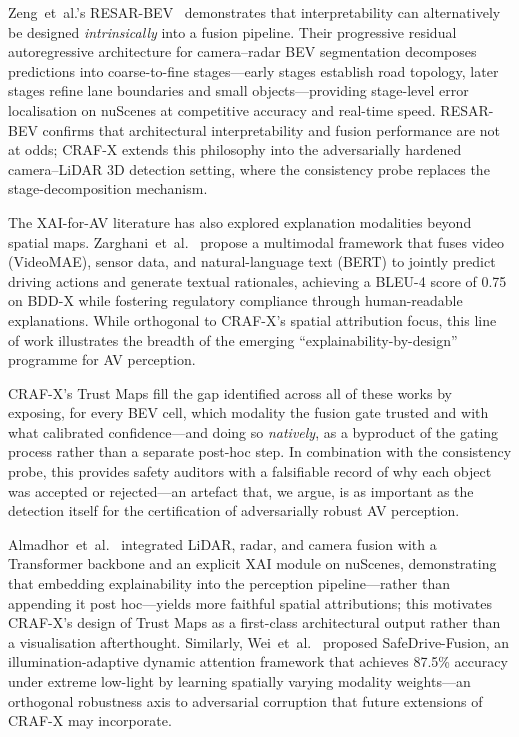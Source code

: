 Zeng~et~al.'s RESAR-BEV~\cite{ZengRESARBEV2025} demonstrates that
interpretability can alternatively be designed \emph{intrinsically} into
a fusion pipeline. Their progressive residual autoregressive architecture
for camera--radar BEV segmentation decomposes predictions into
coarse-to-fine stages---early stages establish road topology, later stages
refine lane boundaries and small objects---providing stage-level error
localisation on nuScenes at competitive accuracy and real-time speed.
RESAR-BEV confirms that architectural interpretability and fusion
performance are not at odds; CRAF-X extends this philosophy into the
adversarially hardened camera--LiDAR 3D detection setting, where the
consistency probe replaces the stage-decomposition mechanism.

The XAI-for-AV literature has also explored explanation modalities
beyond spatial maps. Zarghani~et~al.~\cite{ZarghaniExplainableAD2025}
propose a multimodal framework that fuses video (VideoMAE), sensor data,
and natural-language text (BERT) to jointly predict driving actions and
generate textual rationales, achieving a BLEU-4 score of 0.75 on BDD-X
while fostering regulatory compliance through human-readable explanations.
While orthogonal to CRAF-X's spatial attribution focus, this line of work
illustrates the breadth of the emerging ``explainability-by-design''
programme for AV perception.

CRAF-X's Trust Maps fill the gap identified across all of these works
by exposing, for every BEV cell, which modality the fusion gate trusted
and with what calibrated confidence---and doing so \emph{natively}, as a
byproduct of the gating process rather than a separate post-hoc step.
In combination with the consistency probe, this provides safety auditors
with a falsifiable record of why each object was accepted or rejected---an
artefact that, we argue, is as important as the detection itself for the
certification of adversarially robust AV perception.

Almadhor~et~al.~\cite{AlmadhorMSF2026} integrated LiDAR, radar, and
camera fusion with a Transformer backbone and an explicit XAI module on
nuScenes, demonstrating that embedding explainability into the perception
pipeline---rather than appending it post hoc---yields more faithful
spatial attributions; this motivates CRAF-X's design of Trust Maps as a
first-class architectural output rather than a visualisation afterthought.
Similarly, Wei~et~al.~\cite{WeiSafeDrive2026} proposed SafeDrive-Fusion,
an illumination-adaptive dynamic attention framework that achieves 87.5\%
accuracy under extreme low-light by learning spatially varying modality
weights---an orthogonal robustness axis to adversarial corruption that
future extensions of CRAF-X may incorporate.